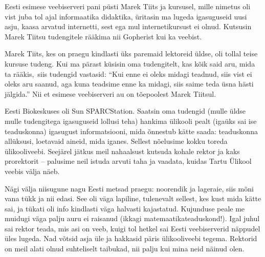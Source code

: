 Eesti esimese veebiserveri pani püsti Marek Tiits 
ja kursusel, mille nimetus oli vist juba tol ajal informaatika 
didaktika, üritasin ma lugeda igasuguseid uusi asju, kaasa arvatud internetti, sest ega mul internetikursust ei olnud. 
Kutsusin Marek Tiitsu tudengitele rääkima nii Gopherist kui 
ka veebist. 

Marek Tiits, kes on praegu kindlasti üks paremaid 
lektoreid üldse, oli tollal teise kursuse tudeng. Kui ma pärast küsisin oma 
tudengitelt, kas kõik said aru, mida ta 
rääkis, siis tudengid vastasid: \enquote{Kui enne ei oleks midagi 
teadnud, siis vist ei oleks aru saanud, aga kuna teadsime enne ka midagi, 
siis saime teda üsna hästi jälgida.} Nii et esimese veebiserveri au on tõepoolest
Marek Tiitsul. 

Eesti Biokeskuses oli Sun SPARCStation. 
Saatsin oma tudengid (mulle üldse mulle tudengitega igasuguseid 
lollusi teha) hankima ülikooli pealt (igaüks sai ise teaduskonna) 
igasugust informatsiooni, mida õnnestub kätte saada: teaduskonna 
allüksusi, loetavaid aineid, mida iganes. Sellest nõelusime kokku
toreda ülikooliveebi. Seejärel jätkus meil nahaalsust kutsuda kohale 
rektor ja kaks prorektorit – palusime neil istuda arvuti taha ja vaadata, kuidas 
Tartu Ülikool veebis välja näeb. 


Nägi välja niisugune nagu Eesti metsad praegu: 
noorendik ja lageraie, siis mõni vana tükk ja nii edasi. See oli väga 
lapiline, tulenevalt sellest, kes kust mida kätte sai, ja tükati oli info kindlasti väga halvasti kajastatud. Kujunduse peale me muidugi 
väga palju auru ei raisanud (ikkagi matemaatikateaduskond!). Igal 
juhul sai rektor teada, mis asi on veeb, kuigi tol hetkel sai Eesti veebiserverid
näppudel üles lugeda. Nad võtsid asja üle ja hakkasid päris ülikooliveebi tegema. Rektorid on meil 
alati olnud suhteliselt taibukad, nii palju kui mina neid näinud olen. 


